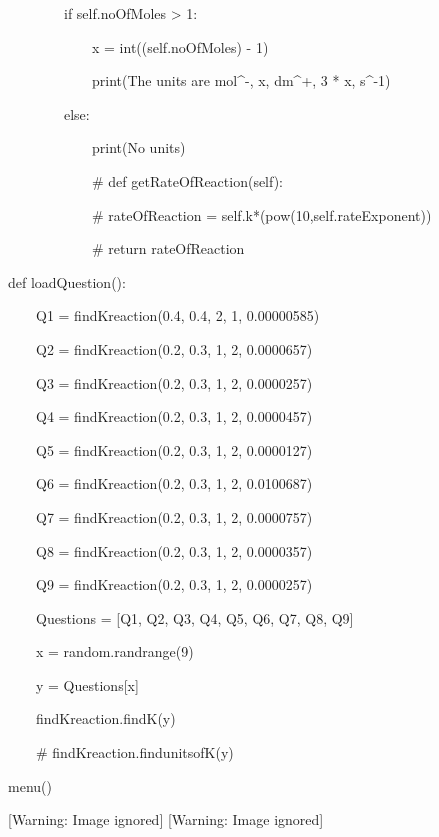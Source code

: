 \documentclass{article}
\begin{document}
\ \ \ \ \ \ \ \ if self.noOfMoles {\textgreater} 1:

\ \ \ \ \ \ \ \ \ \ \ \ x = int((self.noOfMoles) - 1)


\bigskip

\ \ \ \ \ \ \ \ \ \ \ \ print({\textquotedbl}The units are mol\^{}-{\textquotedbl}, x, {\textquotedbl}dm\^{}+{\textquotedbl}, 3 * x, {\textquotedbl}s\^{}-1{\textquotedbl})

\ \ \ \ \ \ \ \ else:

\ \ \ \ \ \ \ \ \ \ \ \ print({\textquotedbl}No units{\textquotedbl})


\bigskip


\bigskip

\ \ \ \ \ \ \ \ \ \ \ \ \# def getRateOfReaction(self):

\ \ \ \ \ \ \ \ \ \ \ \ \# rateOfReaction = self.k*(pow(10,self.rateExponent))

\ \ \ \ \ \ \ \ \ \ \ \ \# return rateOfReaction


\bigskip


\bigskip

def loadQuestion():

\ \ \ \ Q1 = findKreaction(0.4, 0.4, 2, 1, 0.00000585)

\ \ \ \ Q2 = findKreaction(0.2, 0.3, 1, 2, 0.0000657)

\ \ \ \ Q3 = findKreaction(0.2, 0.3, 1, 2, 0.0000257)

\ \ \ \ Q4 = findKreaction(0.2, 0.3, 1, 2, 0.0000457)

\ \ \ \ Q5 = findKreaction(0.2, 0.3, 1, 2, 0.0000127)

\ \ \ \ Q6 = findKreaction(0.2, 0.3, 1, 2, 0.0100687)

\ \ \ \ Q7 = findKreaction(0.2, 0.3, 1, 2, 0.0000757)

\ \ \ \ Q8 = findKreaction(0.2, 0.3, 1, 2, 0.0000357)

\ \ \ \ Q9 = findKreaction(0.2, 0.3, 1, 2, 0.0000257)

\ \ \ \ Questions = [Q1, Q2, Q3, Q4, Q5, Q6, Q7, Q8, Q9]

\ \ \ \ x = random.randrange(9)

\ \ \ \ y = Questions[x]

\ \ \ \ findKreaction.findK(y)

\ \ \ \ \# findKreaction.findunitsofK(y)


\bigskip


\bigskip

menu()

  [Warning: Image ignored] %
   [Warning: Image ignored] %
 
\end{document}
